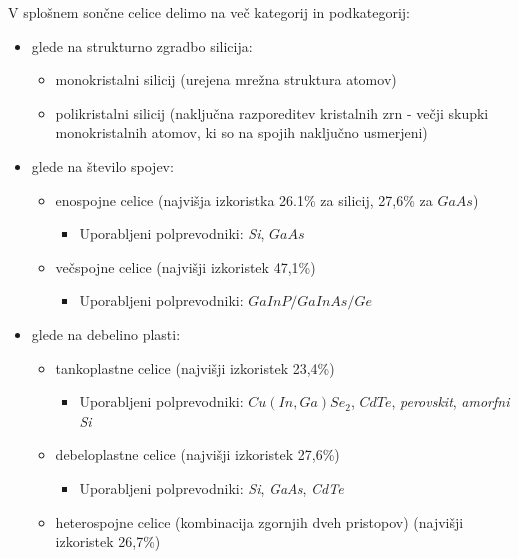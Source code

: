 \documentclass[a4paper,twoside,openright,12pt,slovene]{book}
\begin{document}
V splošnem sončne celice delimo na več kategorij in podkategorij:
\begin{itemize}
    \item glede na strukturno zgradbo silicija:
    \begin{itemize}
        \item monokristalni silicij (urejena mrežna struktura atomov)
        \item polikristalni silicij (naključna razporeditev kristalnih zrn - večji skupki monokristalnih atomov, ki so na spojih naključno usmerjeni)
    \end{itemize}
    
    \item glede na število spojev:
    \begin{itemize}
        \item enospojne celice (najvišja izkoristka 26.1\% za silicij, 27,6\% za $GaAs$)
        \begin{itemize}
            \item Uporabljeni polprevodniki: \textit{Si}, $GaAs$ 
        \end{itemize}
        \item večspojne celice (najvišji izkoristek 47,1\%)
        \begin{itemize}
            \item Uporabljeni polprevodniki: $GaInP/GaInAs/Ge$
        \end{itemize}
    \end{itemize}
    
    \item glede na debelino plasti:
    \begin{itemize}
        \item tankoplastne celice (najvišji izkoristek 23,4\%)
        \begin{itemize}
            \item Uporabljeni polprevodniki: $Cu(In, Ga)Se_2$, $CdTe$, \textit{perovskit}, \textit{amorfni Si}
        \end{itemize}
        \item debeloplastne celice (najvišji izkoristek 27,6\%)
        \begin{itemize}
            \item Uporabljeni polprevodniki: \textit{Si}, \textit{GaAs}, \textit{CdTe} 
        \end{itemize}
        \item heterospojne celice (kombinacija zgornjih dveh pristopov) (najvišji izkoristek 26,7\%)
    \end{itemize}
\end{itemize}
\end{document}
